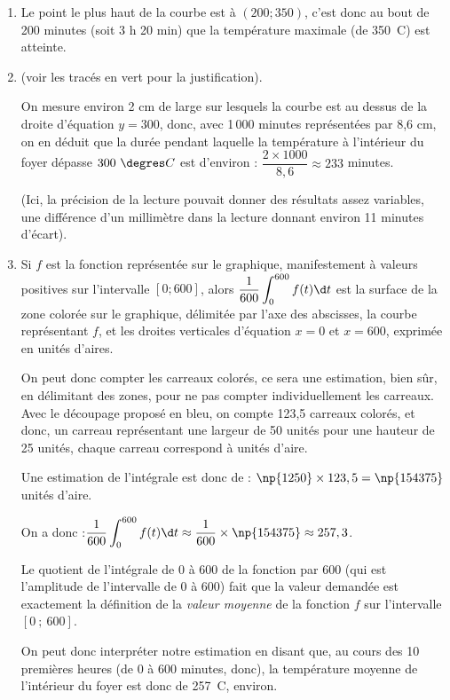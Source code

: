 \begin{enumerate}
	\item Le point le plus haut de la courbe est à $(200 ; 350)$, c'est donc au bout de 200 minutes (soit 3 h 20 min) que la température maximale (de 350~\degres C) est atteinte.

	\item (voir les tracés en vert pour la justification).

On mesure environ 2 cm de large sur lesquels la courbe est au dessus de la droite d'équation $y=300$, donc, avec 1\,000 minutes représentées par 8,6 cm, on en déduit que la durée pendant laquelle la température à l'intérieur du foyer dépasse $300~\degres C$ est d'environ : $\dfrac{2\times 1000}{8,6} \approx 233$ minutes.

(Ici, la précision de la lecture pouvait donner des résultats assez variables, une différence d'un millimètre dans la lecture donnant environ 11 minutes d'écart).

	\item Si $f$ est la fonction représentée sur le graphique, manifestement à valeurs positives sur l'intervalle $[0 ; 600]$, alors $\displaystyle\dfrac{1}{600} \int_{0}^{600} f(t) \d t$ est la surface de la zone colorée sur le graphique, délimitée par l'axe des abscisses, la courbe représentant $f$, et les droites verticales d'équation $x = 0$ et $x = 600$, exprimée en unités d'aires.

On peut donc compter les carreaux colorés, ce sera une estimation, bien sûr, en délimitant des zones, pour ne pas compter individuellement les carreaux. Avec le découpage proposé en bleu, on compte 123,5 carreaux colorés, et donc, un carreau représentant une largeur de 50 unités pour une hauteur de 25 unités, chaque carreau correspond à  unités d'aire.

Une estimation de l'intégrale est donc de : \quad $\np{1250}\times 123,5 = \np{154375}$ unités d'aire.

On a donc :\quad  $\displaystyle\dfrac{1}{600} \int_{0}^{600} f(t) \d t \approx \dfrac{1}{600}\times \np{154375} \approx 257,3 $.

Le quotient de l'intégrale de 0 à 600 de la fonction par 600 (qui est l'amplitude de l'intervalle de 0 à 600) fait que la valeur demandée est exactement la définition de la \emph{valeur moyenne} de la fonction $f$ sur l'intervalle $[0~;~600]$.

On peut donc interpréter notre estimation en disant que, au cours des 10 premières heures (de 0 à 600 minutes, donc), la température moyenne de l'intérieur du foyer est donc de 257~\degres C, environ.
\end{enumerate}

